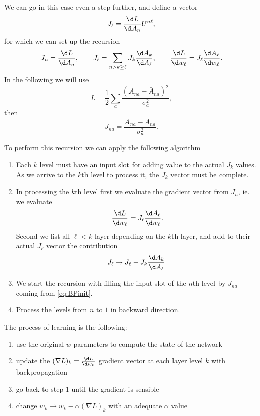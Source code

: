 \documentclass{article}
\begin{document}
We can go in this case even a step further, and define a vector
\begin{equation}
  J_\ell = \frac{\d L}{\d A_{n}} U^{n\ell},
\end{equation}
for which we can set up the recursion
\begin{equation}
  \label{eq:backprop}
  J_n = \frac{\d L}{\d A_{n}},\qquad J_\ell = \sum\limits_{n> k \ge
    \ell} J_k \frac{\d A_{k}}{\d A_{\ell}},\qquad \frac{\d L}{\d
    w_{\ell}} = J_\ell \frac{\d A_{\ell}}{\d w_{\ell}}.
\end{equation}
In the following we will use
\begin{equation}
  L=\frac12 \sum\limits_a\frac{(A_{na}-\bar A_{na})^2}{\sigma_a^2},
\end{equation}
then
\begin{equation}
  \label{eq:BPinit}
  J_{na} = \frac{A_{na}-\bar A_{na}}{\sigma_a^2}.
\end{equation}

To perform this recursion we can apply the following algorithm
\begin{enumerate}
\item Each $k$ level must have an input slot for adding value to the
  actual $J_k$ values. As we arrive to the $k$th level to process it,
  the $J_k$ vector must be complete.
\item In processing the $k$th level first we evaluate the gradient
  vector from $J_n$, ie. we evaluate
  \begin{equation}
    \frac{\d L}{\d w_{\ell}} = J_\ell \frac{\d A_{\ell}}{\d w_{\ell}}.
  \end{equation}
  Second we list all $\ell<k$ layer depending on the $k$th layer, and
  add to their actual $J_\ell$ vector the contribution
  \begin{equation}
    J_\ell \to J_\ell + J_k \frac{\d A_{k}}{\d A_{\ell}}.
  \end{equation}
\item We start the recursion with filling the input slot of the $n$th
  level by $J_{na}$ coming from \eqref{eq:BPinit}.
\item Process the levels from $n$ to $1$ in backward direction.
\end{enumerate}


The process of learning is the following:
\begin{enumerate}
\item use the original $w$ parameters to compute the state of the
  network
\item update the $(\nabla L)_{k} = \frac{\d L}{\d w_k}$ gradient
  vector at each layer level $k$ with backpropagation
\item go back to step 1 until the gradient is sensible
\item change $w_{k}\to w_{k}-\alpha (\nabla L)_{k}$ with an
  adequate $\alpha$ value
\end{enumerate}
\end{document}
